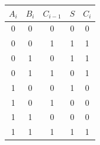 \documentclass{article}
\begin{document}
    \begin{table}[h!]
        \centering
        \begin{tabular}{|c c c|c|c|}
        $A_{i}$ & $B_{i}$ & $C_{i - 1}$ & $S$ & $C_{i}$ \\
        \hline
        0 & 0 & 0 & 0 & 0 \\
        0 & 0 & 1 & 1 & 1 \\
        0 & 1 & 0 & 1 & 1 \\
        0 & 1 & 1 & 0 & 1 \\
        1 & 0 & 0 & 1 & 0 \\
        1 & 0 & 1 & 0 & 0 \\
        1 & 1 & 0 & 0 & 0 \\
        1 & 1 & 1 & 1 & 1 \\
        \hline
        \end{tabular}
        \label{tab:tb}
    \end{table}
\end{document}
